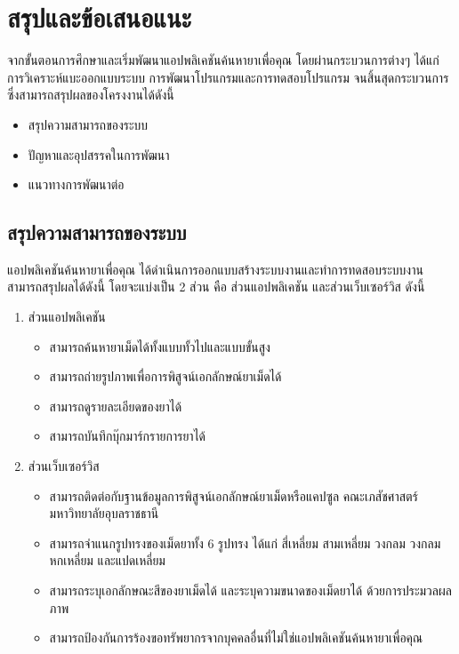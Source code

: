 \usepackage{biblatex}



\chapter{สรุปและข้อเสนอแนะ}
จากขั้นตอนการศึกษาและเริ่มพัฒนาแอปพลิเคชันค้นหายาเพื่อคุณ โดยผ่านกระบวนการต่างๆ 
ได้แก่ การวิเคราะห์แบะออกแบบระบบ การพัฒนาโปรแกรมและการทดสอบโปรแกรม จนสิ้นสุดกระบวนการซึ่งสามารถสรุปผลของโครงงานได้ดังนี้

\begin{itemize}[label={--}]
	\item สรุปความสามารถของระบบ
  \item ปัญหาและอุปสรรคในการพัฒนา
  \item แนวทางการพัฒนาต่อ
\end{itemize}

\section{สรุปความสามารถของระบบ}
แอปพลิเคชันค้นหายาเพื่อคุณ ได้ดำเนินการออกแบบสร้างระบบงานและทำการทดสอบระบบงาน สามารถสรุปผลได้ดังนี้ โดยจะแบ่งเป็น 2 ส่วน คือ ส่วนแอปพลิเคชัน และส่วนเว็บเซอร์วิส ดังนี้
\begin{enumerate}
  \item ส่วนแอปพลิเคชัน
  \begin{itemize}[label={--}]
    \item สามารถค้นหายาเม็ดได้ทั้งแบบทั้วไปและแบบขั้นสูง
    \item	สามารถถ่ายรูปภาพเพื่อการพิสูจน์เอกลักษณ์ยาเม็ดได้
    \item	สามารถดูรายละเอียดของยาได้
    \item	สามารถบันทึกบุ๊กมาร์กรายการยาได้
  \end{itemize}
  \item ส่วนเว็บเซอร์วิส
  \begin{itemize}[label={--}]
    \item สามารถติดต่อกับฐานข้อมูลการพิสูจน์เอกลักษณ์ยาเม็ดหรือแคปซูล คณะเภสัชศาสตร์ มหาวิทยาลัยอุบลราชธานี
    \item สามารถจำแนกรูปทรงของเม็ดยาทั้ง 6 รูปทรง ได้แก่ สี่เหลี่ยม สามเหลี่ยม วงกลม วงกลม หกเหลี่ยม และแปดเหลี่ยม
    \item สามารถระบุเอกลักษณะสีของยาเม็ดได้ และระบุความขนาดของเม็ดยาได้ ด้วยการประมวลผลภาพ
    \item สามารถป้องกันการร้องขอทรัพยากรจากบุคคลอื่นที่ไม่ใช่แอปพลิเคชันค้นหายาเพื่อคุณ
  \end{itemize}
\end{enumerate}

